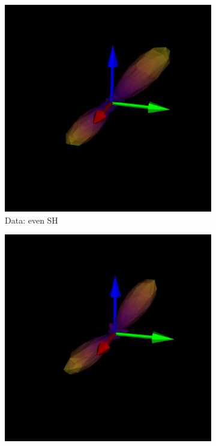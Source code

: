 \documentclass[11pt]{article}
\begin{document}
\begin{figure}[h]
\begin{subfigure}[b]{0.3\textwidth}
    \includegraphics[width=\linewidth]{figs/roi_even}
    \caption{Data: even SH} 
  \end{subfigure}
  \hspace{1em}
  \begin{subfigure}[b]{0.3\textwidth}
    \includegraphics[width=\linewidth]{figs/roi_all}

\end{subfigure}
\end{figure}
\end{document}
